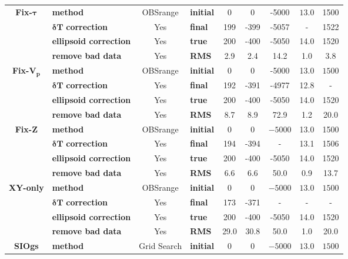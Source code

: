 \begin{table}
{\begin{tabular}{c || l c | l c c c c c}
\hline
\multirow{4}{*}{\textbf{Fix-$\boldsymbol{\tau}$}} & \textbf{method} & OBSrange & \textbf{initial} & 0 & 0 & -5000 & $\mathit{13.0}$ & 1500 \\ 
\multirow{4}{*}{} & $\mathbf{\delta T}$ \textbf{correction} & Yes & \textbf{final}& 199 & -399 & -5057 & - & 1522 \\ 
\multirow{4}{*}{} & \textbf{ellipsoid correction} & Yes & \textbf{true}& 200 & -400 & -5050 & 14.0 & 1520 \\ 
\multirow{4}{*}{} & \textbf{remove bad data} & Yes & \textbf{RMS} & 2.9 & 2.4 & 14.2 & 1.0 & 3.8 \\ 
\hline
\multirow{4}{*}{\textbf{Fix-$\mathbf{V_p}$}} & \textbf{method} & OBSrange & \textbf{initial} & 0 & 0 & -5000 & 13.0 & $\mathit{1500}$ \\ 
\multirow{4}{*}{} & $\mathbf{\delta T}$ \textbf{correction} & Yes & \textbf{final}& 192 & -391 & -4977 & 12.8 & - \\ 
\multirow{4}{*}{} & \textbf{ellipsoid correction} & Yes & \textbf{true}& 200 & -400 & -5050 & 14.0 & 1520 \\ 
\multirow{4}{*}{} & \textbf{remove bad data} & Yes & \textbf{RMS} & 8.7 & 8.9 & 72.9 & 1.2 & 20.0 \\ 
\hline
\multirow{4}{*}{\textbf{Fix-Z}} & \textbf{method} & OBSrange & \textbf{initial} & 0 & 0 & $\mathit{-5000}$ & 13.0 & 1500 \\ 
\multirow{4}{*}{} & $\mathbf{\delta T}$ \textbf{correction} & Yes & \textbf{final}& 194 & -394 & - & 13.1 & 1506 \\ 
\multirow{4}{*}{} & \textbf{ellipsoid correction} & Yes & \textbf{true}& 200 & -400 & -5050 & 14.0 & 1520 \\ 
\multirow{4}{*}{} & \textbf{remove bad data} & Yes & \textbf{RMS} & 6.6 & 6.6 & 50.0 & 0.9 & 13.7 \\ 
\hline
\multirow{4}{*}{\textbf{XY-only}} & \textbf{method} & OBSrange & \textbf{initial} & 0 & 0 & $\mathit{-5000}$ & $\mathit{13.0}$ & $\mathit{1500}$ \\ 
\multirow{4}{*}{} & $\mathbf{\delta T}$ \textbf{correction} & Yes & \textbf{final}& 173 & -371 & - & - & - \\ 
\multirow{4}{*}{} & \textbf{ellipsoid correction} & Yes & \textbf{true}& 200 & -400 & -5050 & 14.0 & 1520 \\ 
\multirow{4}{*}{} & \textbf{remove bad data} & Yes & \textbf{RMS} & 29.0 & 30.8 & 50.0 & 1.0 & 20.0 \\ 
\hline
\multirow{4}{*}{\textbf{SIOgs}} & \textbf{method} & Grid Search & \textbf{initial} & 0 & 0 & $\mathit{-5000}$ & $\mathit{13.0}$ & $\mathit{1500}$ \\ 

\end{tabular}}
\end{table}
